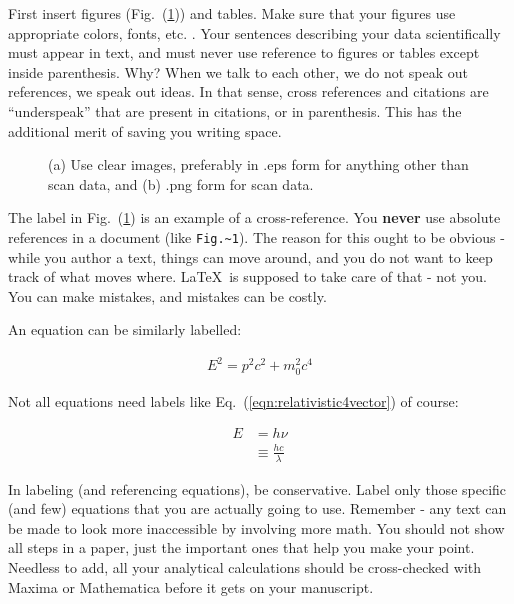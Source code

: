 \documentclass[12 pt]{article}
\begin{document}
First insert figures (Fig.~(\ref{fig:cv})) and tables. Make sure that your figures use appropriate colors, fonts, etc. \cite{mcnames:2006}. Your sentences describing your data scientifically must appear in text, and must never use reference to figures or tables except inside parenthesis. Why? When we talk to each other, we do not speak out references, we speak out ideas. In that sense, cross references and citations are ``underspeak'' that are present in citations, or in parenthesis. This has the additional merit of saving you writing space. 

\begin{figure}
\centering
{}
\caption{(a) Use clear images, preferably in .eps form for anything other than scan data, and (b) .png form for scan data.}
\label{fig:cv}
\end{figure}

The label in Fig.~(\ref{fig:cv}) is an example of a cross-reference. You \textbf{never} use absolute references in a document (like \verb|Fig.~1|). The reason for this ought to be obvious - while you author a text, things can move around, and you do not want to keep track of what moves where. \LaTeX\ is supposed to take care of that - not you. You can make mistakes, and mistakes can be costly.

An equation can be similarly labelled:

\begin{align}
  E^{2} = p^{2} c^{2} + m_{0}^{2} c^{4} \label{eqn:relativistic4vector}
\end{align}

Not all equations need labels like Eq.~(\ref{eqn:relativistic4vector}) of course:

\begin{align}
  E & = h\nu \nonumber \\
  & \equiv \frac{h c}{\lambda} \label{eqn:plancksrelationship}
\end{align}

In labeling (and referencing equations), be conservative. Label only those specific (and few) equations that you are actually going to use. Remember - any text can be made to look more inaccessible by involving more math. You should not show all steps in a paper, just the important ones that help you make your point. Needless to add, all your analytical calculations should be cross-checked with Maxima or Mathematica before it gets on your manuscript.
\end{document}
